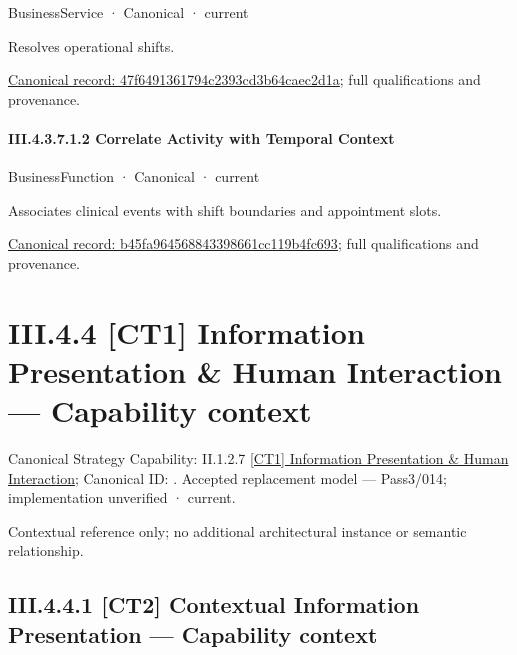 \label{element:47f6491361794c2393cd3b64caec2d1a}
{\small BusinessService · Canonical · current}\par

Resolves operational shifts.


{\footnotesize \href{../../../../../../../../continuum/business/business-service/47f6491361794c2393cd3b64caec2d1a.md}{Canonical record: 47f6491361794c2393cd3b64caec2d1a}; full qualifications and provenance.}\par
\paragraph*{III.4.3.7.1.2 Correlate Activity with Temporal Context}
\label{navigation:III.4.3.7.1.2}

\label{element:b45fa964568843398661cc119b4fc693}
{\small BusinessFunction · Canonical · current}\par

Associates clinical events with shift boundaries and appointment slots.


{\footnotesize \href{../../../../../../../../continuum/business/business-function/b45fa964568843398661cc119b4fc693.md}{Canonical record: b45fa964568843398661cc119b4fc693}; full qualifications and provenance.}\par
\section*{III.4.4 [CT1] Information Presentation \& Human Interaction — Capability context}
\label{navigation:III.4.4}

{\small Canonical Strategy Capability: II.1.2.7 \hyperref[element:6e54d18d8a914aafa39357d66c3a7bf9]{[CT1] Information Presentation \& Human Interaction}; Canonical ID: \texttt{}. Accepted replacement model — Pass3/014; implementation unverified · current.}\par
Contextual reference only; no additional architectural instance or semantic relationship.\par
\subsection*{III.4.4.1 [CT2] Contextual Information Presentation — Capability context}
\label{navigation:III.4.4.1}

